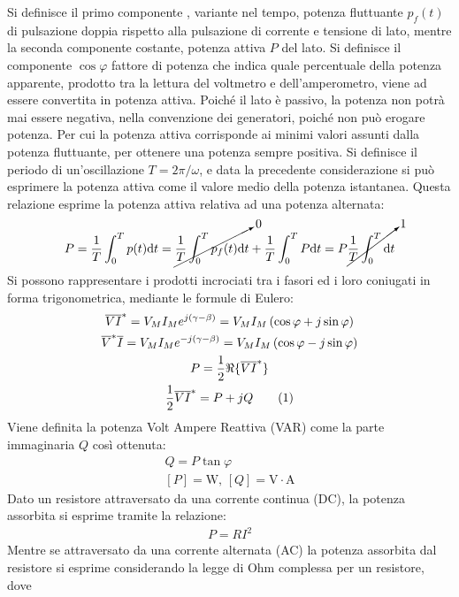 \documentclass{article}
\newcommand{\df}{\mathrm{d}}
\newcommand{\tageq}{\tag{\stepcounter{equation}\theequation}}
\newcommand{\SI}[1]{\mathrm{#1}}
\numberwithin{equation}{subsection}
\begin{document}
Si definisce il primo componente , variante nel tempo, potenza fluttuante $p_f(t)$ di pulsazione doppia rispetto alla pulsazione di corrente e tensione di lato, mentre la seconda 
componente costante, potenza attiva $P$ del lato. Si definisce il componente $\cos\varphi$ fattore di potenza che indica quale percentuale della potenza apparente, prodotto 
tra la lettura del voltmetro e dell'amperometro, viene ad essere convertita in potenza attiva. 
Poiché il lato è passivo, la potenza non potrà mai essere negativa, nella convenzione dei generatori, poiché non può erogare potenza. Per cui la potenza attiva corrisponde 
ai minimi valori assunti dalla potenza fluttuante, per ottenere una potenza sempre positiva. 
Si definisce il periodo di un'oscillazione $T=2\pi/\omega$, e data la precedente considerazione si può esprimere la potenza attiva come il valore medio della potenza 
istantanea. Questa relazione esprime la potenza attiva relativa ad una potenza alternata:
\begin{gather*}
    P=\displaystyle\frac{1}{T}\int_0^Tp(t)\df t=\cancelto{0}{\frac{1}{T}\int_0^Tp_f(t)\df t}+\frac{1}{T}\int_0^TP\df t=P\cancelto{1}{\frac{1}{T}\int_0^T\df t}
\end{gather*}
Si possono rappresentare i prodotti incrociati tra i fasori ed i loro coniugati in forma trigonometrica, mediante le formule di Eulero: 
\begin{gather*}
    \overline{V}\overline{I}^*=V_MI_Me^{j(\gamma-\beta)}=V_MI_M\left(\cos\varphi+j\sin\varphi\right)\\
    \overline{V}^*\overline{I}=V_MI_Me^{-j(\gamma-\beta)}=V_MI_M\left(\cos\varphi-j\sin\varphi\right)\\
    P=\displaystyle\frac{1}{2}\Re\{\overline{V}\overline{I}^*\}\\
    \displaystyle\frac{1}{2}\overline{V}\overline{I}^*=P+jQ\tageq
\end{gather*}
Viene definita la potenza Volt Ampere Reattiva (VAR) come la parte immaginaria $Q$ così ottenuta: 
\begin{gather}
    Q=P\tan\varphi\\
    [P]=\SI{W},\,[Q]=\SI{V}\cdot \SI{A}
\end{gather}
Dato un resistore attraversato da una corrente continua (DC), la potenza assorbita si esprime tramite la relazione:
\begin{gather*}
    P=RI^2
\end{gather*}
Mentre se attraversato da una corrente alternata (AC) la potenza assorbita dal resistore si esprime considerando la legge di Ohm complessa per un resistore, dove 
\end{document}
